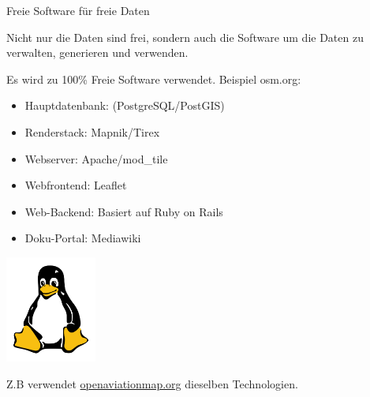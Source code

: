 \documentclass{beamer}
\begin{document}

\begin{frame}{Freie Software für freie Daten}

Nicht nur die Daten sind frei, sondern auch die Software um die Daten zu verwalten, generieren und verwenden.

\vspace{0.6cm}

Es wird zu 100\% Freie Software verwendet. Beispiel osm.org:
\begin{itemize}
  \item Hauptdatenbank: (PostgreSQL/PostGIS) 
  \item Renderstack: Mapnik/Tirex
  \item Webserver: Apache/mod\_tile
  \item Webfrontend: Leaflet
  \item Web-Backend: Basiert auf Ruby on Rails
  \item Doku-Portal: Mediawiki
\end{itemize}


  \vspace*{-3cm}
 \hfill \includegraphics[width=3cm]{tux.png}


\pause

Z.B verwendet \href{http://openaviationmap.org/}{openaviationmap.org} dieselben Technologien.

\end{frame}
\end{document}
